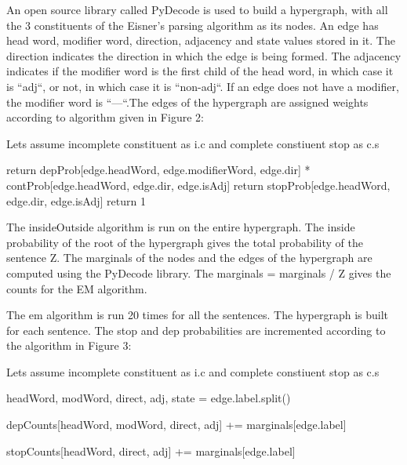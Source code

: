 \documentclass{article}
\begin{document}
An open source library called PyDecode is used to build a hypergraph, with all the 3 constituents of the Eisner's parsing algorithm as its nodes. An edge has head word, modifier word, direction, adjacency and state values stored in it. The direction indicates the direction in which the edge is being formed. The adjacency indicates if the modifier word is the first child of the head word, in which case it is ``adj``, or not, in which case it is ``non-adj``. If an edge does not have a modifier, the modifier word is ``---``.The edges of the hypergraph are assigned weights according to algorithm given in Figure 2:

\begin{algorithm}
  \label{Figure 2}
\begin{algorithmic}


\State Lets assume incomplete constituent as i.c and complete constiuent stop as c.s

   \State return depProb[edge.headWord, edge.modifierWord, edge.dir] * contProb[edge.headWord, edge.dir, edge.isAdj]
   \State return stopProb[edge.headWord, edge.dir, edge.isAdj]
\Else
   \State return 1
\EndIf

\end{algorithmic}
\end{algorithm}

 The insideOutside algorithm is run on the entire hypergraph. The inside probability of the root of the hypergraph gives the total probability of the sentence Z. The marginals of the nodes and the edges of the hypergraph are computed using the PyDecode library. The marginals = marginals / Z gives the counts for the EM algorithm.

The em algorithm is run 20 times for all the sentences. The hypergraph is built for each sentence. The stop and dep probabilities are incremented according to the algorithm in Figure 3:


\begin{algorithm}
  \label{Figure 3}
\begin{algorithmic}

\State Lets assume incomplete constituent as i.c and complete constiuent stop as c.s


   \State headWord, modWord, direct, adj, state = edge.label.split()

          \State depCounts[headWord, modWord, direct, adj] += marginals[edge.label]
        \EndIf

          \State stopCounts[headWord, direct, adj] += marginals[edge.label]
        \EndIf

\EndFor

\end{algorithmic}
\end{algorithm}
\end{document}
